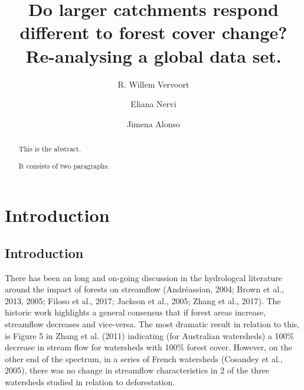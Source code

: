 \documentclass[]{elsarticle} %
\begin{document}
\begin{frontmatter}

  \title{Do larger catchments respond different to forest cover change?
Re-analysing a global data set.}
    \author[The University of Sydney, INIA]{R. Willem Vervoort}
    \author[INIA]{Eliana Nervi}
    \author[IMFIA]{Jimena Alonso}
      \address[The University of Sydney]{School of Life and Environmental Sciences, The University of Sydney,
Sydney, NSW 2006, Australia}
    \address[INIA]{INIA, Uruguay}
    \address[IMFIA]{Institute of Fluid Mechanics and Environmental Engineering, School of
Engineering, Universidad de la República, 11200 Montevideo, Departamento
de Montevideo, Uruguay}
  
  \begin{abstract}
  This is the abstract.
  
  It consists of two paragraphs.
  \end{abstract}
  
 \end{frontmatter}

\hypertarget{introduction}{%
\section{Introduction}\label{introduction}}

\hypertarget{introduction-1}{%
\subsection{Introduction}\label{introduction-1}}

There has been an long and on-going discussion in the hydrologcal
literature around the impact of forests on streamflow (Andréassian,
2004; Brown et al., 2013, 2005; Filoso et al., 2017; Jackson et al.,
2005; Zhang et al., 2017). The historic work highlights a general
consensus that if forest areas increase, streamflow decreases and
vice-versa. The most dramatic result in relation to this, is Figure 5 in
Zhang et al. (2011) indicating (for Australian watersheds) a 100\%
decrease in stream flow for watersheds with 100\% forest cover. However,
on the other end of the spectrum, in a series of French watersheds
(Cosandey et al., 2005), there was no change in streamflow
characteristics in 2 of the three watersheds studied in relation to
deforestation.
\end{document}
